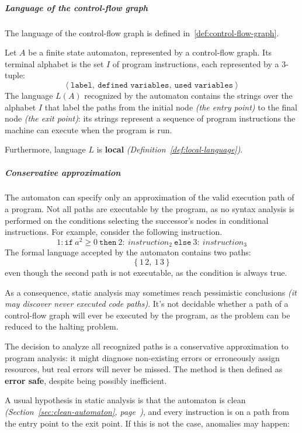 \documentclass[english]{article}
\begin{document}
\subparagraph*{Language of the control-flow graph}
The language of the control-flow graph is defined in~\ref{def:control-flow-graph}.

\begin{definition}
  \label{def:control-flow-graph}
  Let \(A\) be a finite state automaton, represented by a control-flow graph.
  Its terminal alphabet is the set \(I\) of program instructions, each represented by a \(3\)-tuple:
  \[ \left\langle \texttt{label},\ \texttt{defined variables},\ \texttt{used variables} \right\rangle \]
  The language \(L(A)\) recognized by the automaton contains the strings over the alphabet \(I\) that label the paths from the initial node \textit{(the entry point)} to the final node \textit{(the exit point)}:
  its strings represent a sequence of program instructions the machine can execute when the program is run.
\end{definition}

Furthermore, language \(L\) is \textbf{local} \textit{(Definition~\ref{def:local-language})}.

\subparagraph*{Conservative approximation}

The automaton can specify only an approximation of the valid execution path of a program.
Not all paths are executable by the program, as no syntax analysis is performed on the conditions selecting the successor's nodes in conditional instructions.
For example, consider the following instruction.
\[ 1: \texttt{if} \ a^2 \geq 0 \ \texttt{then} \ 2: \ \textit{instruction}_2 \ \texttt{else} \ 3: \ \textit{instruction}_3 \]
The formal language accepted by the automaton contains two paths:
\[ \left\{ 1 \, 2, \ 1 \, 3 \right\} \]
even though the second path is not executable, as the condition is always true.

As a consequence, static analysis may sometimes reach pessimistic conclusions \textit{(it may discover never executed code paths)}.
It's not decidable whether a path of a control-flow graph will ever be executed by the program, as the problem can be reduced to the halting problem.

The decision to analyze all recognized paths is a conservative approximation to program analysis:
it might diagnose non-existing errors or erroneously assign resources, but real errors will never be missed.
The method is then defined as \textbf{error safe}, despite being possibly inefficient.

A usual hypothesis in static analysis is that the automaton is clean \textit{(Section~\ref{sec:clean-automaton}, page~\pageref{sec:clean-automaton})}, and every instruction is on a path from the entry point to the exit point.
If this is not the case, anomalies may happen:
\end{document}
